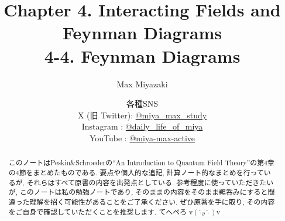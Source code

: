 \documentclass[a4paper,12pt]{article}
\title{Chapter 4. Interacting Fields and Feynman Diagrams\\
4-4. Feynman Diagrams}
\date{各種SNS\\
    X (旧 Twitter): \href{https://x.com/miya_max_study}{@miya\_max\_study}\\
    Instagram : \href{https://www.instagram.com/daily_life_of_miya/}{@daily\_life\_of\_miya}\\
    YouTube : \href{https://www.youtube.com/@miya-max-active}{@miya-max-active}
    }
\author{Max Miyazaki}
\begin{document}
\maketitle

\vspace{1cm}
\begin{abstract}
    このノートはPeskin\&Schroederの``An Introduction to Quantum Field Theory''の第4章の4節をまとめたものである. 要点や個人的な追記, 計算ノート的なまとめを行っているが, それらはすべて原書の内容を出発点としている. 参考程度に使っていただきたいが, このノートは私の勉強ノートであり, そのままの内容をそのまま鵜呑みにすると間違った理解を招く可能性があることをご了承ください. ぜひ原著を手に取り, その内容をご自身で確認していただくことを推奨します. てへぺろ v$({\hat{\cdot}_\partial \hat{\cdot}})$v
\end{abstract}
    
    

\newpage
\color{blue}
\end{document}
